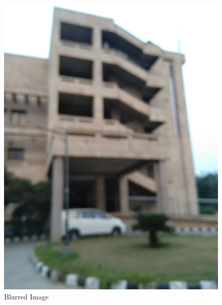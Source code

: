 \documentclass{article}
\begin{document}
    \begin{figure}[!htb]
      \includegraphics[scale=0.35]{./real_world/bharti/bharti.png}
      \caption{Blurred Image}
    \endminipage\hfill

\end{figure}
\end{document}
